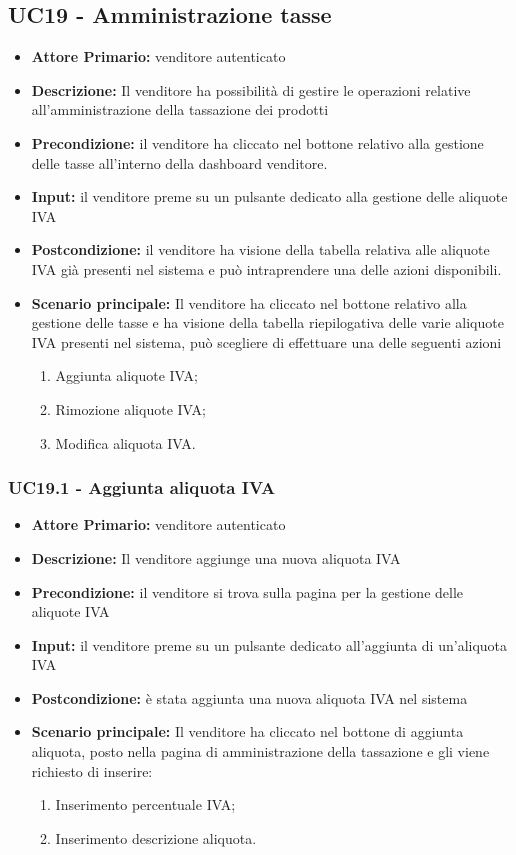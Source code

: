\subsection{UC19 - Amministrazione tasse}
\label{UC19}
\begin{itemize}
    \item \textbf{Attore Primario:} venditore autenticato
    \item \textbf{Descrizione:} Il venditore ha possibilità di gestire le operazioni relative all’amministrazione della tassazione dei prodotti 
    \item \textbf{Precondizione:} il venditore ha cliccato nel bottone relativo alla gestione delle tasse all’interno della dashboard venditore.
    \item \textbf{Input:} il venditore preme su un pulsante dedicato alla gestione delle aliquote IVA
    \item \textbf{Postcondizione:} il venditore ha visione della tabella relativa alle aliquote IVA già presenti nel sistema e può intraprendere una delle azioni disponibili.
    \item \textbf{Scenario principale:} Il venditore ha cliccato nel bottone relativo alla gestione delle tasse e ha visione della tabella riepilogativa delle varie aliquote IVA presenti nel sistema, può scegliere di effettuare una delle seguenti azioni 
    \begin{enumerate}
        \item Aggiunta aliquote IVA;
        \item Rimozione aliquote IVA;
        \item Modifica aliquota IVA.
    \end{enumerate}
\end{itemize}


\subsubsection{UC19.1 - Aggiunta aliquota IVA}
\label{UC19.1}
\begin{itemize}
    \item \textbf{Attore Primario:}  venditore autenticato
    \item \textbf{Descrizione:} Il venditore aggiunge una nuova aliquota IVA  
    \item \textbf{Precondizione:} il venditore si trova sulla pagina per la gestione delle aliquote IVA
    \item \textbf{Input:} il venditore preme su un pulsante dedicato all'aggiunta di un'aliquota IVA
    \item \textbf{Postcondizione:} è stata aggiunta una nuova aliquota IVA nel sistema
    \item \textbf{Scenario principale:} Il venditore ha cliccato nel bottone di aggiunta aliquota, posto nella pagina di amministrazione della tassazione e gli viene richiesto di inserire:
    \begin{enumerate}
        \item Inserimento percentuale IVA;
        \item Inserimento descrizione aliquota.
    \end{enumerate}
\end{itemize}


